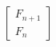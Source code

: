 \documentclass[preview]{standalone}
\begin{document}
\begin{align*}
\begin{bmatrix} F_{n+1} \\ F_{n} \end{bmatrix}
\end{align*}
\end{document}
